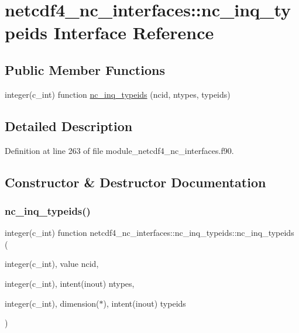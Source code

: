 \hypertarget{interfacenetcdf4__nc__interfaces_1_1nc__inq__typeids}{}\section{netcdf4\+\_\+nc\+\_\+interfaces\+:\+:nc\+\_\+inq\+\_\+typeids Interface Reference}
\label{interfacenetcdf4__nc__interfaces_1_1nc__inq__typeids}
\subsection*{Public Member Functions}
\begin{DoxyCompactItemize}
\item 
integer(c\+\_\+int) function \hyperlink{interfacenetcdf4__nc__interfaces_1_1nc__inq__typeids_a93824898256edf55816f022a23382020}{nc\+\_\+inq\+\_\+typeids} (ncid, ntypes, typeids)
\end{DoxyCompactItemize}


\subsection{Detailed Description}


Definition at line 263 of file module\+\_\+netcdf4\+\_\+nc\+\_\+interfaces.\+f90.



\subsection{Constructor \& Destructor Documentation}
\mbox{\label{interfacenetcdf4__nc__interfaces_1_1nc__inq__typeids_a93824898256edf55816f022a23382020}} 
\subsubsection{\texorpdfstring{nc\+\_\+inq\+\_\+typeids()}{nc\_inq\_typeids()}}
{\footnotesize\ttfamily integer(c\+\_\+int) function netcdf4\+\_\+nc\+\_\+interfaces\+::nc\+\_\+inq\+\_\+typeids\+::nc\+\_\+inq\+\_\+typeids (\begin{DoxyParamCaption}\item[{integer(c\+\_\+int), value}]{ncid,  }\item[{integer(c\+\_\+int), intent(inout)}]{ntypes,  }\item[{integer(c\+\_\+int), dimension($\ast$), intent(inout)}]{typeids }\end{DoxyParamCaption})}



